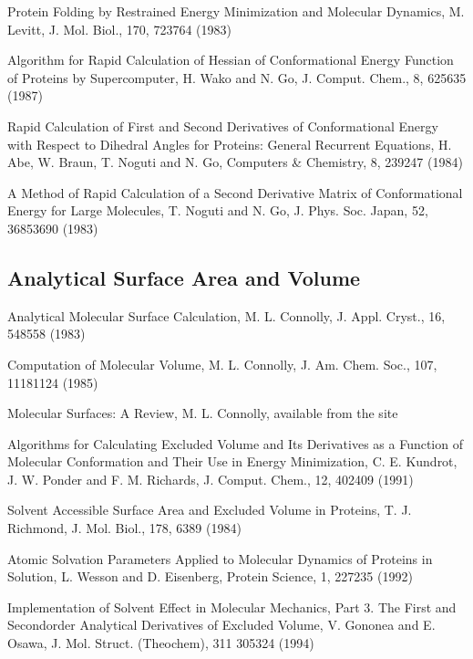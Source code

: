 \documentclass[letterpaper,11pt,english]{sphinxmanual}
\begin{document}
Protein Folding by Restrained Energy Minimization and Molecular Dynamics, M. Levitt, J. Mol. Biol., 170, 723\sphinxhyphen{}764 (1983)

Algorithm for Rapid Calculation of Hessian of Conformational Energy Function of Proteins by Supercomputer, H. Wako and N. Go, J. Comput. Chem., 8, 625\sphinxhyphen{}635 (1987)

Rapid Calculation of First and Second Derivatives of Conformational Energy with Respect to Dihedral Angles for Proteins: General Recurrent Equations, H. Abe, W. Braun, T. Noguti and N. Go, Computers \& Chemistry, 8, 239\sphinxhyphen{}247 (1984)

A Method of Rapid Calculation of a Second Derivative Matrix of Conformational Energy for Large Molecules, T. Noguti and N. Go, J. Phys. Soc. Japan, 52, 3685\sphinxhyphen{}3690 (1983)


\subsection{Analytical Surface Area and Volume}
\label{\detokenize{text/references:analytical-surface-area-and-volume}}
Analytical Molecular Surface Calculation, M. L. Connolly, J. Appl. Cryst., 16, 548\sphinxhyphen{}558 (1983)

Computation of Molecular Volume, M. L. Connolly, J. Am. Chem. Soc., 107, 1118\sphinxhyphen{}1124 (1985)

Molecular Surfaces: A Review, M. L. Connolly, available from the site 

Algorithms for Calculating Excluded Volume and Its Derivatives as a Function of Molecular Conformation and Their Use in Energy Minimization, C. E. Kundrot, J. W. Ponder and F. M. Richards, J. Comput. Chem., 12, 402\sphinxhyphen{}409 (1991)

Solvent Accessible Surface Area and Excluded Volume in Proteins, T. J. Richmond, J. Mol. Biol., 178, 63\sphinxhyphen{}89 (1984)

Atomic Solvation Parameters Applied to Molecular Dynamics of Proteins in Solution, L. Wesson and D. Eisenberg, Protein Science, 1, 227\sphinxhyphen{}235 (1992)

Implementation of Solvent Effect in Molecular Mechanics, Part 3. The First\sphinxhyphen{} and Second\sphinxhyphen{}order Analytical Derivatives of Excluded Volume, V. Gononea and E. Osawa, J. Mol. Struct. (Theochem), 311 305\sphinxhyphen{}324 (1994)
\end{document}
